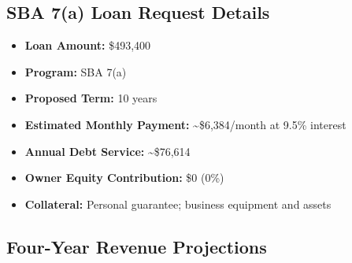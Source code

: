 \documentclass[11pt,letterpaper]{article}
\begin{document}
\subsection{SBA 7(a) Loan Request Details}

\begin{itemize}
  \item \textbf{Loan Amount:} \$493,400
  \item \textbf{Program:} SBA 7(a)
  \item \textbf{Proposed Term:} 10 years
  \item \textbf{Estimated Monthly Payment:} \textasciitilde\$6,384/month at 9.5\% interest
  \item \textbf{Annual Debt Service:} \textasciitilde\$76,614
  \item \textbf{Owner Equity Contribution:} \$0 (0\%)
  \item \textbf{Collateral:} Personal guarantee; business equipment and assets
\end{itemize}

\subsection{Four-Year Revenue Projections}
\end{document}
